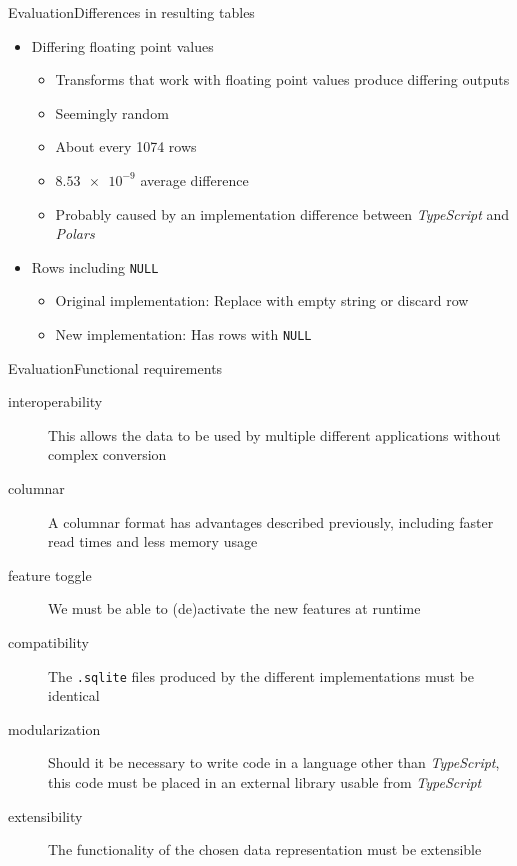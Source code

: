 \begin{frame}[t]{Evaluation}{Differences in resulting tables}
	\begin{itemize}
		\item Differing floating point values
		      \begin{itemize}
			      \item Transforms that work with floating point values produce differing outputs
			      \item Seemingly random
			      \item About every 1074 rows
			      \item $\num{8.53e-9}$ average difference
			      \item Probably caused by an implementation difference between \emph{TypeScript} and \emph{Polars}
		      \end{itemize}
		\item Rows including \Verb|NULL|
		      \begin{itemize}
			      \item Original implementation: Replace with empty string or discard row
			      \item New implementation: Has rows with \Verb|NULL|
		      \end{itemize}
	\end{itemize}

\end{frame}

\begin{frame}[t]{Evaluation}{Functional requirements}
	\begin{description}
		\item[interoperability] This allows the data to be used by multiple different applications without complex conversion \uncover<2->{({\color{green} \checkmark})}
		\item[columnar] A columnar format has advantages described previously, including faster read times and less memory usage \uncover<3->{({\color{green} \checkmark})}
		\item[feature toggle] We must be able to (de)activate the new features at runtime \uncover<4->{({\color{green} \checkmark})}
		\item[compatibility] The \Verb|.sqlite| files produced by the different implementations must be identical \uncover<5->{({\color{red} \xmark})}
		\item[modularization] Should it be necessary to write code in a language other than \emph{TypeScript}, this code must be placed in an external library usable from \emph{TypeScript} \uncover<6->{({\color{green} \checkmark})}
		\item[extensibility] The functionality of the chosen data representation must be extensible \uncover<7->{({\color{green} \checkmark})}
	\end{description}
\end{frame}

